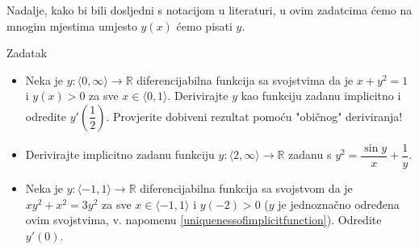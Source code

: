 Nadalje, kako bi bili dosljedni s notacijom u literaturi, u ovim zadatcima ćemo na mnogim mjestima umjesto $y(x)$ ćemo pisati $y$.
\begin{exercise}{Zadatak} \textbf{}
\begin{itemize}
\item[a)] Neka je $y : \langle 0, \infty\rangle\to \mathbb{R}$ diferencijabilna funkcija sa svojstvima da je $x+y^2=1$ i $y(x)>0$ za sve $x\in \langle 0, 1\rangle$. Derivirajte $y$ kao funkciju zadanu implicitno i odredite $y'\left(\dfrac{1}{2}\right)$. Provjerite dobiveni rezultat pomoću "običnog" deriviranja!
\item[b)] Derivirajte implicitno zadanu funkciju $y : \langle 2,\infty\rangle\to \mathbb{R}$ zadanu s $y^2=\dfrac{\sin{y}}{x}+\dfrac{1}{y}$.
\item[c)] Neka je $y : \langle -1, 1\rangle\to \mathbb{R}$ diferencijabilna funkcija sa svojstvom da je $xy^2+x^2=3y^2$ za sve $x\in \langle -1, 1\rangle$ i $y(-2)>0$ ($y$ je jednoznačno određena ovim svojstvima, v. napomenu \ref{uniquenessofimplicitfunction}). Odredite $y'(0)$.
\end{itemize}
\end{exercise}
